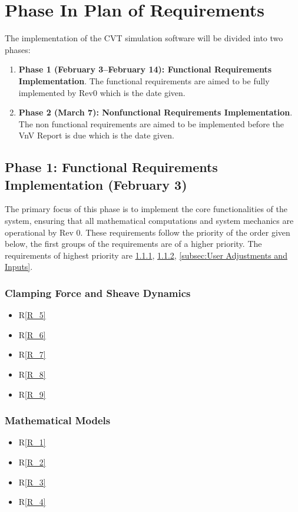 \documentclass[12pt]{article}
\begin{document}
  \section{Phase In Plan of Requirements}

  The implementation of the CVT simulation software will be divided into two phases:
  \begin{enumerate}
      \item \textbf{Phase 1 (February 3–February 14): Functional Requirements Implementation}. The functional requirements are aimed to be fully implemented by Rev0 which is the date given. 
      \item \textbf{Phase 2 (March 7): Nonfunctional Requirements Implementation}. The non functional requirements are aimed to be implemented before the VnV Report is due which is the date given. 
  \end{enumerate}
  
  \subsection{Phase 1: Functional Requirements Implementation (February 3)}
  
  The primary focus of this phase is to implement the core functionalities of the system, ensuring that all mathematical computations and system mechanics are operational by Rev 0.
  These requirements follow the priority of the order given below, the first groups of the requirements are of a higher priority. 
  The requirements of highest priority are \ref{subsec:Clamping Force and Sheave Dynamics}, \ref{subsec:Mathematical Models}, \ref{subsec:User Adjustments and Inputs}. 
  
  \subsubsection{Clamping Force and Sheave Dynamics}
  \label{subsec:Clamping Force and Sheave Dynamics}
  \begin{itemize}
      \item R\ref{R_5}
      \item R\ref{R_6}
      \item R\ref{R_7}
      \item R\ref{R_8}
      \item R\ref{R_9}
  \end{itemize}

  \subsubsection{Mathematical Models}
  \label{subsec:Mathematical Models}
  \begin{itemize}
       \item R\ref{R_1}
       \item R\ref{R_2}
       \item R\ref{R_3}
       \item R\ref{R_4}
  \end{itemize}
  
\end{document}
